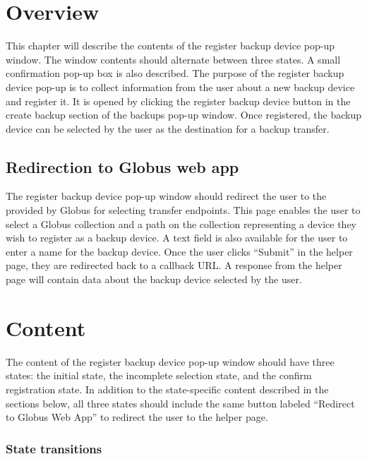 
\section{Overview}

This chapter will describe the contents of the register backup device pop-up 
window. The window contents should alternate between three states. A small confirmation 
pop-up box is also described. The purpose of the register backup device pop-up is to 
collect information from the user about a new backup device and register it. It is opened 
by clicking the register backup device button in the create backup section of the backups 
pop-up window. Once registered, the backup device can be selected by the user as the 
destination for a backup transfer.

\subsection{Redirection to Globus web app}

The register backup device pop-up window should redirect the user to the 
 provided by Globus for 
selecting transfer endpoints. This page enables the user to select a Globus collection
and a path on the collection representing a device they wish to register as a backup device.
A text field is also available for the user to enter a name for the backup device.
Once the user clicks ``Submit'' in the helper page, they are redirected back to a callback 
URL. A response from the helper page will contain data about the backup device selected by 
the user.

\section{Content}

The content of the register backup device pop-up window should have three states: the initial state,
the incomplete selection state, and the confirm registration state. In addition to the state-specific
content described in the sections below, all three states should include the same button labeled 
``Redirect to Globus Web App'' to redirect the user to the helper page.

\subsubsection{State transitions}

